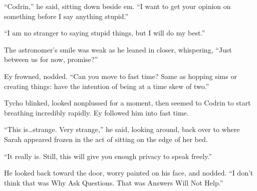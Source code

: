 ``Codrin,'' he said, sitting down beside em. ``I want to get your opinion on something before I say anything stupid.''

``I am no stranger to saying stupid things, but I will do my best.''

The astronomer's smile was weak as he leaned in closer, whispering, ``Just between us for now, promise?''

Ey frowned, nodded. ``Can you move to fast time? Same as hopping sims or creating things: have the intention of being at a time skew of two.''

Tycho blinked, looked nonplussed for a moment, then seemed to Codrin to start breathing incredibly rapidly. Ey followed him into fast time.

``This is\ldots strange. Very strange,'' he said, looking around, back over to where Sarah appeared frozen in the act of sitting on the edge of her bed.

``It really is. Still, this will give you enough privacy to speak freely.''

He looked back toward the door, worry painted on his face, and nodded. ``I don't think that was Why Ask Questions. That was Answers Will Not Help.''
